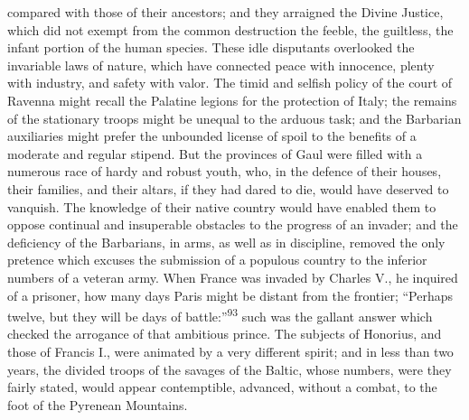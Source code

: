 compared with those of their ancestors; and they arraigned the
Divine Justice, which did not exempt from the common destruction
the feeble, the guiltless, the infant portion of the human
species. These idle disputants overlooked the invariable laws of
nature, which have connected peace with innocence, plenty with
industry, and safety with valor. The timid and selfish policy of
the court of Ravenna might recall the Palatine legions for the
protection of Italy; the remains of the stationary troops might
be unequal to the arduous task; and the Barbarian auxiliaries
might prefer the unbounded license of spoil to the benefits of a
moderate and regular stipend. But the provinces of Gaul were
filled with a numerous race of hardy and robust youth, who, in
the defence of their houses, their families, and their altars, if
they had dared to die, would have deserved to vanquish. The
knowledge of their native country would have enabled them to
oppose continual and insuperable obstacles to the progress of an
invader; and the deficiency of the Barbarians, in arms, as well
as in discipline, removed the only pretence which excuses the
submission of a populous country to the inferior numbers of a
veteran army. When France was invaded by Charles V., he inquired
of a prisoner, how many days Paris might be distant from the
frontier; “Perhaps twelve, but they will be days of battle:”\textsuperscript{93}
such was the gallant answer which checked the arrogance of that
ambitious prince. The subjects of Honorius, and those of Francis
I., were animated by a very different spirit; and in less than
two years, the divided troops of the savages of the Baltic, whose
numbers, were they fairly stated, would appear contemptible,
advanced, without a combat, to the foot of the Pyrenean
Mountains.





